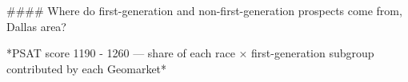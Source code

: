 #### Where do first-generation and non-first-generation prospects come from, Dallas area?

*PSAT score 1190 - 1260 — share of each race × first-generation subgroup contributed by each Geomarket*
